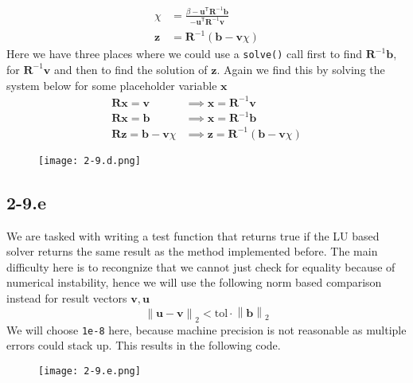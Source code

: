 \documentclass{article}
\begin{document}
\begin{align*}
    \chi &=  \frac{\beta - \mathbf{u}^{\mathsf{T}}\mathbf{R}^{-1}\mathbf{b}}{- \mathbf{u}^{\mathsf{T}}\mathbf{R}^{-1}\mathbf{v}} \\[1mm]
    \mathbf{z}  &= \mathbf{R}^{-1}\left(\mathbf{b} - \mathbf{v}\chi\right)
\end{align*}
Here we have three places where we could use a \verb|solve()| call first to find $\mathbf{R}^{-1}\mathbf{b}$, for $\mathbf{R}^{-1}\mathbf{v}$  and then to find the solution of $\mathbf{z}$. Again we find this by solving the system below for some placeholder variable $\mathbf{x}$
\begin{align*}
    \mathbf{R}\mathbf{x} = \mathbf{v} &\implies \mathbf{x} = \mathbf{R}^{-1}\mathbf{v} \\
    \mathbf{R}\mathbf{x} = \mathbf{b} &\implies \mathbf{x} = \mathbf{R}^{-1}\mathbf{b} \\
    \mathbf{R}\mathbf{z} = \mathbf{b} - \mathbf{v}\chi &\implies \mathbf{z} = \mathbf{R}^{-1}\left(\mathbf{b} - \mathbf{v}\chi\right)
\end{align*}

\begin{figure}[!hbt]
    \centering
\texttt{[image: 2-9.d.png]}
\end{figure}

\pagebreak

\subsection*{2-9.e}
We are tasked with writing a test function that returns true if the LU based solver returns the same result as the method implemented before. The main difficulty here is to recongnize that we cannot just check for equality because of numerical instability, hence we will use the following norm based comparison instead for result vectors $\mathbf{v}, \mathbf{u}$
\begin{equation*}
    \left\lVert \mathbf{u} - \mathbf{v}\right\rVert_{2} < \text{tol} \cdot \left\lVert \mathbf{b}\right\rVert_{2}
\end{equation*}
We will choose \verb|1e-8| here, because machine precision is not reasonable as multiple errors could stack up. This results in the following code.

\begin{figure}[!hbt]
    \centering
\texttt{[image: 2-9.e.png]}
\end{figure}
\end{document}
